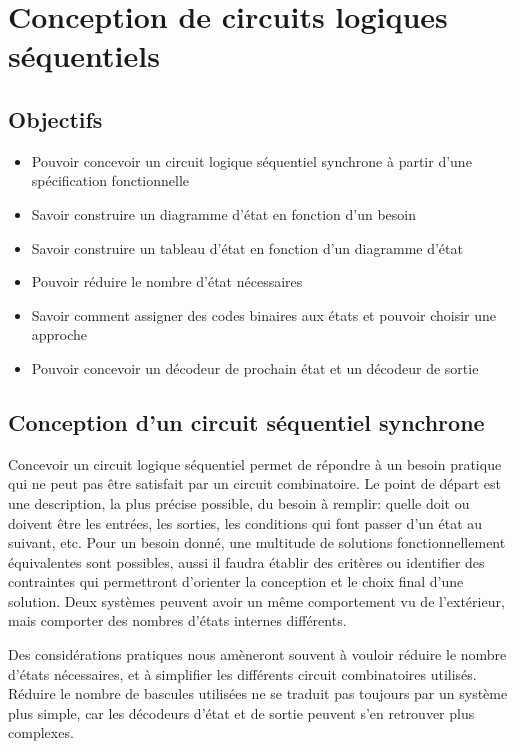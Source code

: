 \documentclass[11pt]{article}
\begin{document}
\section{Conception de circuits logiques séquentiels}
\label{sec:orgb99e743}
\subsection{Objectifs}
\label{sec:orgb64fae4}
\begin{itemize}
\item Pouvoir concevoir un circuit logique séquentiel synchrone à partir
d'une spécification fonctionnelle
\item Savoir construire un diagramme d'état en fonction d'un besoin
\item Savoir construire un tableau d'état en fonction d'un diagramme d'état
\item Pouvoir réduire le nombre d'état nécessaires
\item Savoir comment assigner des codes binaires aux états et pouvoir
choisir une approche
\item Pouvoir concevoir un décodeur de prochain état et un décodeur de sortie
\end{itemize}

\subsection{Conception d'un circuit séquentiel synchrone}
\label{sec:org03b32ae}

Concevoir un circuit logique séquentiel permet de répondre à un besoin
pratique qui ne peut pas être satisfait par un circuit combinatoire.
Le point de départ est une description, la plus précise possible, du
besoin à remplir: quelle doit ou doivent être les entrées, les
sorties, les conditions qui font passer d'un état au suivant,
etc. Pour un besoin donné, une multitude de solutions
fonctionnellement équivalentes sont possibles, aussi il faudra établir
des critères ou identifier des contraintes qui permettront d'orienter
la conception et le choix final d'une solution. Deux systèmes peuvent
avoir un même comportement vu de l'extérieur, mais comporter des
nombres d'états internes différents.

Des considérations pratiques nous amèneront souvent à vouloir réduire
le nombre d'états nécessaires, et à simplifier les différents circuit
combinatoires utilisés. Réduire le nombre de bascules utilisées ne se
traduit pas toujours par un système plus simple, car les décodeurs
d'état et de sortie peuvent s'en retrouver plus complexes.
\end{document}

